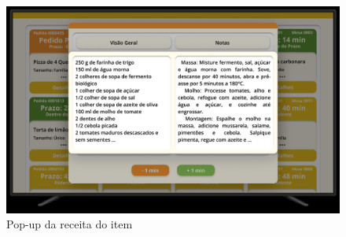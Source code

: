 \begin{center}
    \newpage
    \begin{figure}[!htp]
        \includegraphics[width=1\textwidth]{imagens-template/Layout_Cozinha_2610.png} 
        \caption{Pop-up da receita do item}
    \end{figure} 
\end{center}